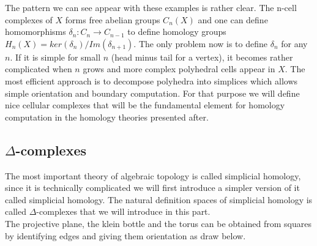 \documentclass[12pt, a4paper]{article}
\begin{document}
The pattern we can see appear with these examples is rather clear. The n-cell complexes of $X$ forms free abelian groups $C_n(X)$ and one can define homomorphisms $\delta_n: C_n \to C_{n-1}$ to define homology groups $H_n(X) = ker(\delta_n)/Im(\delta_{n+1})$. The only problem now is to define $\delta_n$ for any $n$. If it is simple for small $n$ (head minus tail for a vertex), it becomes rather complicated when $n$ grows and more complex polyhedral cells appear in $X$. The most efficient approach is to decompose polyhedra into simplices which allows simple orientation and boundary computation. For that purpose we will define nice cellular complexes that will be the fundamental element for homology computation in the homology theories presented after. 

\subsection{$\Delta$-complexes}

The most important theory of algebraic topology is called simplicial homology, since it is technically complicated we will first introduce a simpler version of it called simplicial homology. The natural definition spaces of simplicial homology is called $\Delta$-complexes that we will introduce in this part.\\

The projective plane, the klein bottle and the torus can be obtained from squares by identifying edges and giving them orientation as draw below.
\end{document}
